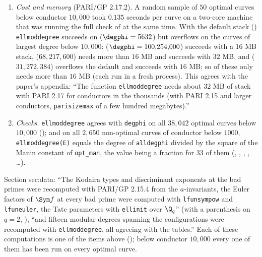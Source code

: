 \begin{sloppypar}
\begin{remark}
\begin{enumerate}[label=(\roman*)]
{increasing stack size}'' when it enlarges the stack.
\item \emph{Cost and memory} (PARI/GP 2.17.2). A random sample of $50$ optimal curves below conductor $10{,}000$ took $0.135$ seconds per curve on a
two-core machine that was running the full check of  at the same time. With the default stack
() \texttt{ellmoddegree} succeeds on  ($\degphi=5632$) but overflows on the curves of largest degree below
$10{,}000$:  ($\degphi=100{,}254{,}000$) succeeds with a $16$ MB stack,  ($68{,}217{,}600$) needs more than $16$ MB and succeeds
with $32$ MB, and  ($31{,}272{,}384$) overflows the default and succeeds with $16$ MB; so of these only 
needs more than $16$ MB (each run in a fresh process). This agrees with the paper's appendix: ``The
function \texttt{ellmoddegree} needs about $32$ MB of stack with PARI 2.17 for conductors in the thousands (with PARI 2.15 and larger
conductors, \texttt{parisizemax} of a few hundred megabytes).''
\item \emph{Checks.} \texttt{ellmoddegree} agrees with \texttt{degphi} on all $38{,}042$ optimal curves below $10{,}000$
(); and on all $2{,}650$ non-optimal curves of conductor below $1000$, \texttt{ellmoddegree(E)} equals the degree
of \texttt{alldegphi} divided by the square of the Manin constant of \texttt{opt\_man}, the value being a fraction for $33$ of them (,
, , , \dots).
\end{enumerate}
\end{remark}

\begin{paperlink}\label{pl:computation:invariants}
Section sec:data: ``The Kodaira types and discriminant exponents at the bad primes were recomputed with PARI/GP 2.15.4 \cite{PARI} from the
$a$-invariants, the Euler factors of $\Sym f$ at every bad prime were computed with \texttt{lfunsympow} and \texttt{lfuneuler}, the Tate
parameters with \texttt{ellinit} over $\Q_q$'' (with a parenthesis on $q=2$, ), ``and fifteen modular degrees
spanning the configurations were recomputed with \texttt{ellmoddegree}, all agreeing with the tables.'' Each of these computations is one of the items above
(); below
conductor $10{,}000$ every one of them has been run on every optimal curve.
\end{paperlink}


\end{sloppypar}
